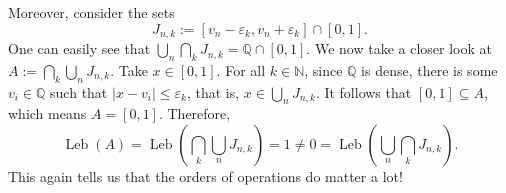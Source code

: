 \documentclass[12pt]{article}
\newcommand\Q{\mathbb{Q}}
\newcommand\N{\mathbb{N}}
\newcommand\eps{\varepsilon}
\DeclareMathOperator{\leb}{Leb}
\begin{document}
Moreover, consider the sets
$$
    J_{n,k} := [v_n - \eps_k,v_n + \eps_k] \cap [0,1].
$$
One can easily see that $\bigcup_n \bigcap_k J_{n,k} = \Q \cap [0,1]$.
We now take a closer look at $A := \bigcap_k \bigcup_n J_{n,k}$.
Take $x \in [0,1]$. For all $k \in \N$, since $\Q$ is dense, 
there is some $v_i \in \Q$ such that $|x - v_i| \leq \eps_k$,
that is, $x \in \bigcup_n J_{n,k}$. 
It follows that $[0,1] \subseteq A$, which means $A = [0,1]$.
Therefore,
$$
   \leb(A) = \leb(\bigcap_k \bigcup_n J_{n,k}) = 1
   \neq 0 = \leb(\bigcup_n \bigcap_k J_{n,k}).
$$
This again tells us that the orders of operations do matter a lot!
\end{document}
